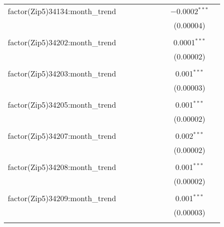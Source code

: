\begin{table}[H]
{\begin{tabular}{@{\extracolsep{5pt}}lcccccccc}
  factor(Zip5)34134:month\_trend &  &  &  &  &  &  & $-$0.0002$^{***}$ &  \\  

   &  &  &  &  &  &  & (0.00004) &  \\  

   & & & & & & & & \\  

  factor(Zip5)34202:month\_trend &  &  &  &  &  &  & 0.0001$^{***}$ &  \\  

   &  &  &  &  &  &  & (0.00002) &  \\  

   & & & & & & & & \\  

  factor(Zip5)34203:month\_trend &  &  &  &  &  &  & 0.001$^{***}$ &  \\  

   &  &  &  &  &  &  & (0.00003) &  \\  

   & & & & & & & & \\  

  factor(Zip5)34205:month\_trend &  &  &  &  &  &  & 0.001$^{***}$ &  \\  

   &  &  &  &  &  &  & (0.00002) &  \\  

   & & & & & & & & \\  

  factor(Zip5)34207:month\_trend &  &  &  &  &  &  & 0.002$^{***}$ &  \\  

   &  &  &  &  &  &  & (0.00002) &  \\  

   & & & & & & & & \\  

  factor(Zip5)34208:month\_trend &  &  &  &  &  &  & 0.001$^{***}$ &  \\  

   &  &  &  &  &  &  & (0.00002) &  \\  

   & & & & & & & & \\  

  factor(Zip5)34209:month\_trend &  &  &  &  &  &  & 0.001$^{***}$ &  \\  

   &  &  &  &  &  &  & (0.00003) &  \\  

   & & & & & & & & \\  


\end{tabular}}
\end{table}
